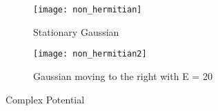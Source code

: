 \documentclass{article}
\begin{document}
\begin{figure}
\centering
\begin{subfigure}{0.3\textwidth}
\centering
\texttt{[image: non\_hermitian]}
\caption{Stationary Gaussian}
\end{subfigure}
%
\begin{subfigure}{0.3\textwidth}
\centering
\texttt{[image: non\_hermitian2]}
\caption{Gaussian moving to the right with E = 20}
\end{subfigure}

\caption{Complex Potential}
\end{figure}
\end{document}
